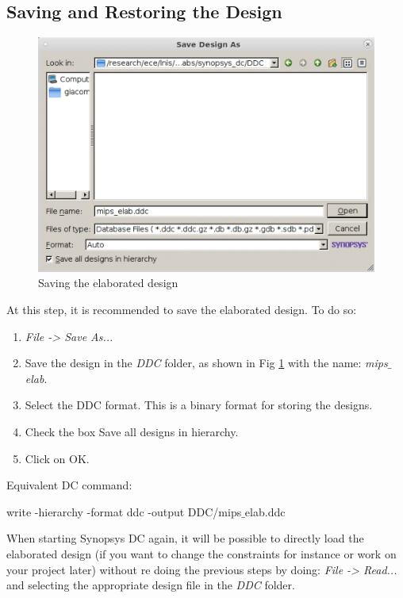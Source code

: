 \subsection{Saving and Restoring the Design}
	\parbox[t]{\dimexpr\textwidth-\leftmargin}{%
	\begin{figure}
		\vspace{-6mm}
		\centering
		\vspace{-\baselineskip}
		\includegraphics[scale=0.34]{figures/lab3_design_compiler/save_elab}
\caption{Saving the elaborated design}
\label{fig_save_elab}
	\end{figure}
At this step, it is recommended to save the elaborated design. To do so: 
\begin{enumerate}
	\item \textit {File -> Save As...}
	\item Save the design in the \textit{DDC} folder, as shown in Fig \ref{fig_save_elab} with the name: \textit{mips$\_$elab}.
	\item Select the DDC format. This is a binary format for storing the designs.
	\item Check the box {Save all designs in hierarchy.}
	\item Click on OK.
\end{enumerate}
}

\clearpage
Equivalent DC command:
	\begin{codeline}
	write -hierarchy -format ddc -output DDC/mips$\_$elab.ddc
\end{codeline}


When starting Synopsys DC again, it will be possible to directly load the elaborated design (if you want to change the constraints for instance or work on your project later) without re doing the previous steps by doing: \textit {File -> Read...} and selecting the appropriate design file in the \textit{DDC} folder.\\

